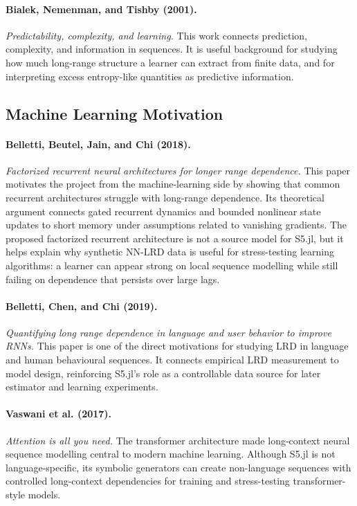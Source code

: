\documentclass[11pt]{article}
\begin{document}
\paragraph{Bialek, Nemenman, and Tishby (2001).}
\emph{Predictability, complexity, and learning.}
This work connects prediction, complexity, and information in sequences. It is
useful background for studying how much long-range structure a learner can
extract from finite data, and for interpreting excess entropy-like quantities as
predictive information.

\subsection{Machine Learning Motivation}

\paragraph{Belletti, Beutel, Jain, and Chi (2018).}
\emph{Factorized recurrent neural architectures for longer range dependence.}
This paper motivates the project from the machine-learning side by showing that
common recurrent architectures struggle with long-range dependence. Its
theoretical argument connects gated recurrent dynamics and bounded nonlinear
state updates to short memory under assumptions related to vanishing gradients.
The proposed factorized recurrent architecture is not a source model for
S5.jl, but it helps explain why synthetic NN-LRD data is useful for
stress-testing learning algorithms: a learner can appear strong on local
sequence modelling while still failing on dependence that persists over large
lags.

\paragraph{Belletti, Chen, and Chi (2019).}
\emph{Quantifying long range dependence in language and user behavior to improve
RNNs.}
This paper is one of the direct motivations for studying LRD in language and
human behavioural sequences. It connects empirical LRD measurement to model
design, reinforcing S5.jl's role as a controllable data source for later
estimator and learning experiments.

\paragraph{Vaswani et al. (2017).}
\emph{Attention is all you need.}
The transformer architecture made long-context neural sequence modelling central
to modern machine learning. Although S5.jl is not language-specific, its symbolic
generators can create non-language sequences with controlled long-context
dependencies for training and stress-testing transformer-style models.
\end{document}
